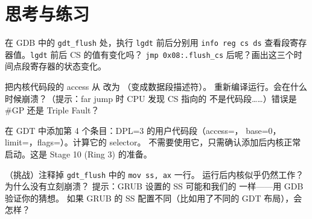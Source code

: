 \section{思考与练习}

\begin{exercise}
在 GDB 中的 \texttt{gdt\_flush} 处，执行 \texttt{lgdt} 前后分别用
\texttt{info reg cs ds} 查看段寄存器值。\texttt{lgdt} 前后 CS 的值有变化吗？
\texttt{jmp 0x08:.flush\_cs} 后呢？画出这三个时间点段寄存器的状态变化。
\end{exercise}

\begin{exercise}
把内核代码段的 access 从  改为 （变成数据段描述符）。
重新编译运行。会在什么时候崩溃？（提示：far jump 时 CPU 发现 CS 指向的
不是代码段……）错误是 \#GP 还是 Triple Fault？
\end{exercise}

\begin{exercise}
在 GDT 中添加第 4 个条目：DPL=3 的用户代码段（access=，
base=0，limit=，flags=）。计算它的 selector。
不需要使用它，只需确认添加后内核正常启动。这是 Stage 10 (Ring 3) 的准备。
\end{exercise}

\begin{exercise}
（挑战）注释掉 \texttt{gdt\_flush} 中的 \texttt{mov ss, ax} 一行。
运行后内核似乎仍然工作？为什么没有立刻崩溃？
提示：GRUB 设置的 SS 可能和我们的  一样——用 GDB 验证你的猜想。
如果 GRUB 的 SS 配置不同（比如用了不同的 GDT 布局），会怎样？
\end{exercise}


